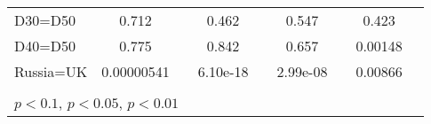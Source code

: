 \begin{tabular}{l|cccccc|cc}
D30=D50         &    0.712         &         &    0.462         &         &    0.547         &         &    0.423         &         \\
D40=D50         &    0.775         &         &    0.842         &         &    0.657         &         &  0.00148         &         \\
Russia=UK       &0.00000541         &         & 6.10e-18         &         & 2.99e-08         &         &  0.00866         &         \\
\hline\hline
\multicolumn{9}{p{16cm}}{\tiny }\\
\multicolumn{9}{l}{\tiny \sym{*} \(p<0.1\), \sym{**} \(p<0.05\), \sym{***} \(p<0.01\)}\\
\end{tabular}